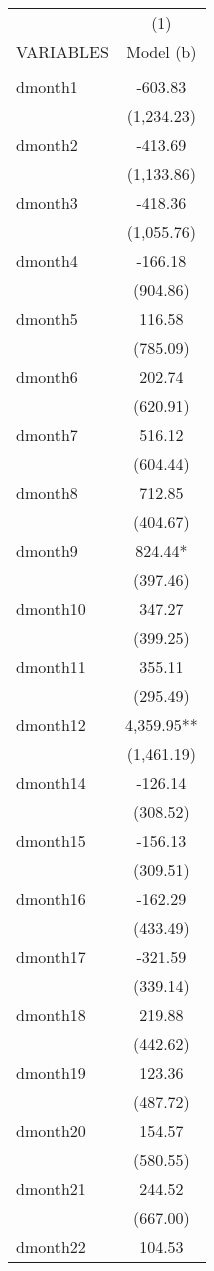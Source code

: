 \begin{tabular}{lc} \hline
 & (1) \\
VARIABLES & Model (b) \\ \hline
 &  \\
dmonth1 & -603.83 \\
 & (1,234.23) \\
dmonth2 & -413.69 \\
 & (1,133.86) \\
dmonth3 & -418.36 \\
 & (1,055.76) \\
dmonth4 & -166.18 \\
 & (904.86) \\
dmonth5 & 116.58 \\
 & (785.09) \\
dmonth6 & 202.74 \\
 & (620.91) \\
dmonth7 & 516.12 \\
 & (604.44) \\
dmonth8 & 712.85 \\
 & (404.67) \\
dmonth9 & 824.44* \\
 & (397.46) \\
dmonth10 & 347.27 \\
 & (399.25) \\
dmonth11 & 355.11 \\
 & (295.49) \\
dmonth12 & 4,359.95** \\
 & (1,461.19) \\
dmonth14 & -126.14 \\
 & (308.52) \\
dmonth15 & -156.13 \\
 & (309.51) \\
dmonth16 & -162.29 \\
 & (433.49) \\
dmonth17 & -321.59 \\
 & (339.14) \\
dmonth18 & 219.88 \\
 & (442.62) \\
dmonth19 & 123.36 \\
 & (487.72) \\
dmonth20 & 154.57 \\
 & (580.55) \\
dmonth21 & 244.52 \\
 & (667.00) \\
dmonth22 & 104.53 \\

\end{tabular}
